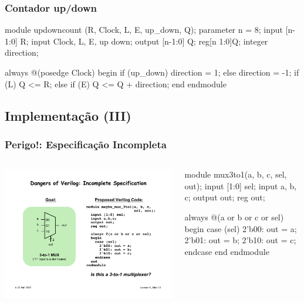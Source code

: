 \begin{frame}[fragile]
	\frametitle{Contador up/down}
	\begin{verilogcode}
module updowncount (R, Clock, L, E, up_down, Q); 
  parameter n = 8;
  input [n-1:0] R;
  input Clock, L, E, up down;
  output [n-1:0] Q; 
  reg[n 1:0]Q; 
  integer direction;
  
  always @(posedge Clock) 
  begin
    if (up_down) 
      direction = 1;
    else
      direction = -1; 
    if (L)
      Q <= R; 
    else if (E)
      Q <= Q + direction; 
  end
endmodule
	\end{verilogcode}
\end{frame}

\subsection{Implementação (III)}

\begin{frame}[fragile]
	\frametitle{Perigo!: Especificação Incompleta}
	\begin{columns}
        \includegraphics[scale=.5]{figs/Mux3to1}
	    \begin{verilogcode}
module mux3to1(a, b, c, sel, out);
  input [1:0] sel;
  input a, b, c;
  output out;
  reg out;
  
  always @(a or b or c or sel)
  begin
    case (sel)
      2'b00: out = a;
      2'b01: out = b;
      2'b10: out = c;
    endcase
  end
endmodule
        \end{verilogcode}
    \end{columns}
\end{frame}

